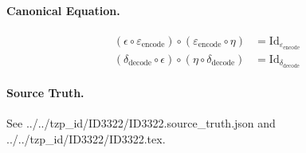 \paragraph{Canonical Equation.}
\[
\begin{align} ( \epsilon \circ \varepsilon_{ \text{encode}}) \circ ( \varepsilon_{ \text{encode}} \circ \eta) &= \text{Id}_{ \varepsilon_{ \text{encode}}} \\ ( \delta_{ \text{decode}} \circ \epsilon) \circ ( \eta \circ \delta_{ \text{decode}}) &= \text{Id}_{ \delta_{ \text{decode}}} \end{align}
\]

\paragraph{Source Truth.}
See ../../tzp\_id/ID3322/ID3322.source\_truth.json and ../../tzp\_id/ID3322/ID3322.tex.
